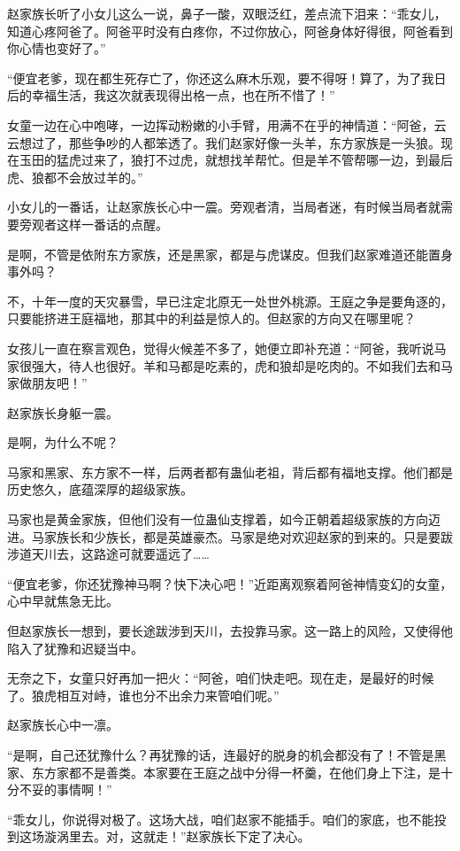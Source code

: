 \begin{this_body}
赵家族长听了小女儿这么一说，鼻子一酸，双眼泛红，差点流下泪来：“乖女儿，知道心疼阿爸了。阿爸平时没有白疼你，不过你放心，阿爸身体好得很，阿爸看到你心情也变好了。”

“便宜老爹，现在都生死存亡了，你还这么麻木乐观，要不得呀！算了，为了我日后的幸福生活，我这次就表现得出格一点，也在所不惜了！”

女童一边在心中咆哮，一边挥动粉嫩的小手臂，用满不在乎的神情道：“阿爸，云云想过了，那些争吵的人都笨透了。我们赵家好像一头羊，东方家族是一头狼。现在玉田的猛虎过来了，狼打不过虎，就想找羊帮忙。但是羊不管帮哪一边，到最后虎、狼都不会放过羊的。”

小女儿的一番话，让赵家族长心中一震。旁观者清，当局者迷，有时候当局者就需要旁观者这样一番话的点醒。

是啊，不管是依附东方家族，还是黑家，都是与虎谋皮。但我们赵家难道还能置身事外吗？

不，十年一度的天灾暴雪，早已注定北原无一处世外桃源。王庭之争是要角逐的，只要能挤进王庭福地，那其中的利益是惊人的。但赵家的方向又在哪里呢？

女孩儿一直在察言观色，觉得火候差不多了，她便立即补充道：“阿爸，我听说马家很强大，待人也很好。羊和马都是吃素的，虎和狼却是吃肉的。不如我们去和马家做朋友吧！”

赵家族长身躯一震。

是啊，为什么不呢？

马家和黑家、东方家不一样，后两者都有蛊仙老祖，背后都有福地支撑。他们都是历史悠久，底蕴深厚的超级家族。

马家也是黄金家族，但他们没有一位蛊仙支撑着，如今正朝着超级家族的方向迈进。马家族长和少族长，都是英雄豪杰。马家是绝对欢迎赵家的到来的。只是要跋涉道天川去，这路途可就要遥远了……

“便宜老爹，你还犹豫神马啊？快下决心吧！”近距离观察着阿爸神情变幻的女童，心中早就焦急无比。

但赵家族长一想到，要长途跋涉到天川，去投靠马家。这一路上的风险，又使得他陷入了犹豫和迟疑当中。

无奈之下，女童只好再加一把火：“阿爸，咱们快走吧。现在走，是最好的时候了。狼虎相互对峙，谁也分不出余力来管咱们呢。”

赵家族长心中一凛。

“是啊，自己还犹豫什么？再犹豫的话，连最好的脱身的机会都没有了！不管是黑家、东方家都不是善类。本家要在王庭之战中分得一杯羹，在他们身上下注，是十分不妥的事情啊！”

“乖女儿，你说得对极了。这场大战，咱们赵家不能插手。咱们的家底，也不能投到这场漩涡里去。对，这就走！”赵家族长下定了决心。


\end{this_body}
